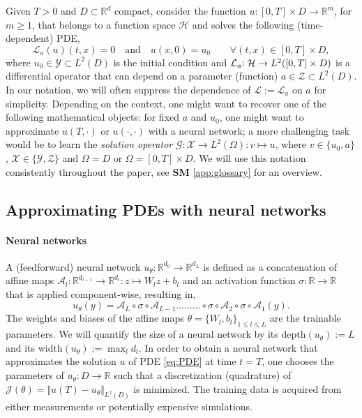 \documentclass{article}
\numberwithin{equation}{section}
\newcommand{\size}{\mathrm{size}}
\newcommand{\width}{\mathrm{width}}
\newcommand{\depth}{\mathrm{depth}}
\newcommand{\R}{\mathbb{R}}
\newcommand{\cA}{\mathcal{A}}
\newcommand{\cG}{\mathcal{G}}
\newcommand{\cH}{\mathcal{H}}
\newcommand{\cJ}{\mathcal{J}}
\newcommand{\cL}{\mathcal{L}}
\newcommand{\cX}{\mathcal{X}}
\newcommand{\cY}{\mathcal{Y}}
\newcommand{\cZ}{\mathcal{Z}}
\newcommand{\1}{\mathbbm{1}}
\begin{document}
Given $T>0$ and $D\subset \R^d$ compact, consider the function $u:[0,T]\times D\to \R^m$, for $m \geq 1$, that {\color{black} belongs to a function space $\cH$} and solves the following (time-dependent) PDE,
\begin{equation}\label{eq:PDE}
    \cL_a(u)(t,x) = 0\quad\text{and}\quad u(x, 0) = u_0\qquad \forall (t,x)\in[0,T]\times D, 
\end{equation}
where $u_0\in \cY \subset L^2(D)$ is the initial condition and $\cL_a{\color{black}:\cH\to L^2([0,T]\times D)}$ is a differential operator that can depend on a parameter (function) $a\in\cZ \subset L^2(D)$. In our notation, we will often suppress the dependence of $\cL:=\cL_a$ on $a$ for simplicity. Depending on the context, one might want to recover one of the following mathematical objects: for fixed $a$ and $u_0$, one might want to approximate $u(T,\cdot)$ or $u (\cdot,\cdot)$ with a neural network; a more challenging task would be to learn the \emph{solution operator} $\cG: \cX \to L^2(\Omega):v\mapsto u$, where $v\in \{u_0,a\}$,  $\cX\in\{\cY,\cZ\}$ and $\Omega=D$ or $\Omega=[0,T]\times D$. We will use this notation consistently throughout the paper, see \textbf{SM} \ref{app:glossary} for an overview.

\subsection{Approximating PDEs with neural networks}\label{sec:pde-nn}

\paragraph{Neural networks}\label{sec:prel-nn}

A (feedforward) neural network $u_{\theta}:\R^{d_0}\to\R^{d_L}$ is defined as a concatenation of affine maps $\cA_l: \R^{ d_{l-1}}\to \R^{d_{l}}: z\mapsto W_lz+b_l$
and an activation function $\sigma:\R\to\R$ that is applied component-wise, resulting in,
\begin{equation}
\label{eq:ann1}
u_{\theta}(y) = \cA_L \circ\sigma \circ \cA_{L-1}\ldots \ldots \ldots \circ\sigma \circ \cA_2 \circ \sigma \circ \cA_1(y).
\end{equation} 
The weights and biases of the affine maps $\theta = \{W_l, b_l\}_{1\leq l \leq L}$ are the trainable parameters. We will quantify the size of a neural network by its $\depth(u_\theta) := L$ and its $\width(u_\theta) := \max_l d_l$.
In order to obtain a neural network that approximates the solution $u$ of PDE \eqref{eq:PDE} at time $t=T$, one chooses the parameters of $u_\theta:D\to \R$ such that a discretization (quadrature) of $\cJ(\theta) =\Vert u(T)-u_\theta\Vert_{L^2(D)}$ is minimized. 
The training data is acquired from either measurements or potentially expensive simulations. %
\end{document}
